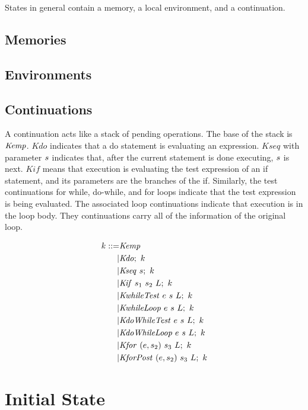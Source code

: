 \documentclass{llncs}
\begin{document}
States in general contain a memory, a local environment, and a continuation.

\subsection{Memories}

\subsection{Environments}

\subsection{Continuations}
\label{app:continuations}

A continuation acts like a stack of pending operations. The base of the stack is
\(\mathit{Kemp}\). \(\mathit{Kdo}\) indicates that a do statement is evaluating an expression.
\(\mathit{Kseq}\) with parameter \(s\) indicates that, after the current statement
is done executing, \(s\) is next. \(\mathit{Kif}\) means that execution is evaluating
the test expression of an if statement, and its parameters are the branches of the
if. Similarly, the test continuations for while, do-while, and for loops indicate that
the test expression is being evaluated. The associated loop continuations indicate that
execution is in the loop body. They continuations carry all of the information of the original
loop.

\[\begin{split}
k ::= & \mathit{Kemp} \\
| & \mathit{Kdo};~ k \\
| & \mathit{Kseq} ~ s; ~ k \\
| & \mathit{Kif} ~ s_1 ~ s_2 ~ L; ~ k \\
| & \mathit{KwhileTest} ~ e ~ s ~ L; ~ k \\
| & \mathit{KwhileLoop} ~ e ~ s ~ L; ~ k \\
| & \mathit{KdoWhileTest} ~ e ~ s ~ L; ~ k \\
| & \mathit{KdoWhileLoop} ~ e ~ s ~ L; ~ k \\
| & \mathit{Kfor} ~ (e,s_2) ~ s_3 ~ L ; ~ k \\
| & \mathit{KforPost} ~ (e,s_2) ~ s_3 ~ L ; ~ k \\
\end{split}\]


\section{Initial State}
\end{document}

